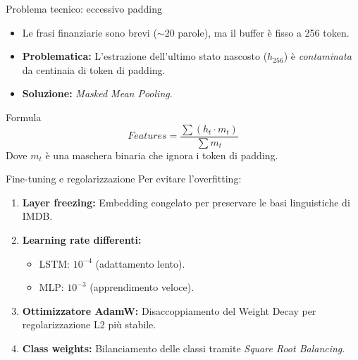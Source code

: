 \documentclass{beamer}
\begin{document}
\begin{frame}{Problema tecnico: eccessivo padding}
    \begin{itemize}
        \item Le frasi finanziarie sono brevi ($\sim$20 parole), ma il buffer è fisso a 256 token.
        \item \textbf{Problematica:} L'estrazione dell'ultimo stato nascosto ($h_{256}$) è \textit{contaminata} da centinaia di token di padding.
        \item \textbf{Soluzione:} \textit{Masked Mean Pooling}.
    \end{itemize}
    \begin{exampleblock}{Formula}
        \[ Features = \frac{\sum (h_t \cdot m_t)}{\sum m_t} \]
        Dove $m_t$ è una maschera binaria che ignora i token di padding.
    \end{exampleblock}
\end{frame}

\begin{frame}{Fine-tuning e regolarizzazione}
    Per evitare l'overfitting:
    \begin{enumerate}
        \item \textbf{Layer freezing:} Embedding congelato per preservare le basi linguistiche di IMDB.
        \item \textbf{Learning rate differenti:}
              \begin{itemize}
                  \item LSTM: $10^{-4}$ (adattamento lento).
                  \item MLP: $10^{-3}$ (apprendimento veloce).
              \end{itemize}
        \item \textbf{Ottimizzatore AdamW:} Disaccoppiamento del Weight Decay per regolarizzazione L2 più stabile.
        \item \textbf{Class weights:} Bilanciamento delle classi tramite \textit{Square Root Balancing}.
    \end{enumerate}
\end{frame}
\end{document}
